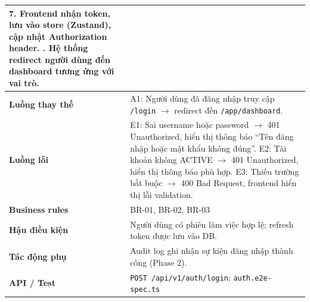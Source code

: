 \begin{table}[H]
\begin{tabularx}{\textwidth}{|p{3.6cm}|X|}
7. Frontend nhận token, lưu vào store (Zustand), cập nhật Authorization header. \newline
8. Hệ thống redirect người dùng đến dashboard tương ứng với vai trò. \\
\hline
\textbf{Luồng thay thế} & A1: Người dùng đã đăng nhập truy cập \texttt{/login} $\rightarrow$ redirect đến \texttt{/app/dashboard}. \\
\hline
\textbf{Luồng lỗi} &
E1: Sai username hoặc password $\rightarrow$ 401 Unauthorized, hiển thị thông báo ``Tên đăng nhập hoặc mật khẩu không đúng''. \newline
E2: Tài khoản không ACTIVE $\rightarrow$ 401 Unauthorized, hiển thị thông báo phù hợp. \newline
E3: Thiếu trường bắt buộc $\rightarrow$ 400 Bad Request, frontend hiển thị lỗi validation. \\
\hline
\textbf{Business rules} & BR-01, BR-02, BR-03 \\
\hline
\textbf{Hậu điều kiện} & Người dùng có phiên làm việc hợp lệ; refresh token được lưu vào DB. \\
\hline
\textbf{Tác động phụ} & Audit log ghi nhận sự kiện đăng nhập thành công (Phase 2). \\
\hline
\textbf{API / Test} & \texttt{POST /api/v1/auth/login}; \texttt{auth.e2e-spec.ts} \\
\hline
\end{tabularx}
\end{table}

